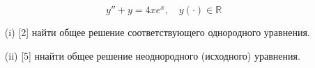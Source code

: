\documentclass[a4paper, 12pt]{article}
\begin{document}
$$
y''+y=4xe^x, \quad y(\cdot) \in \mathbb{R}
$$
\begin{itemize}
\item [(i)][2]  найти общее решение соответствующего однородного уравнения.
\item [(ii)][5] ннайти общее решение неоднородного (исходного) уравнения.

\end{itemize}
\end{document}
